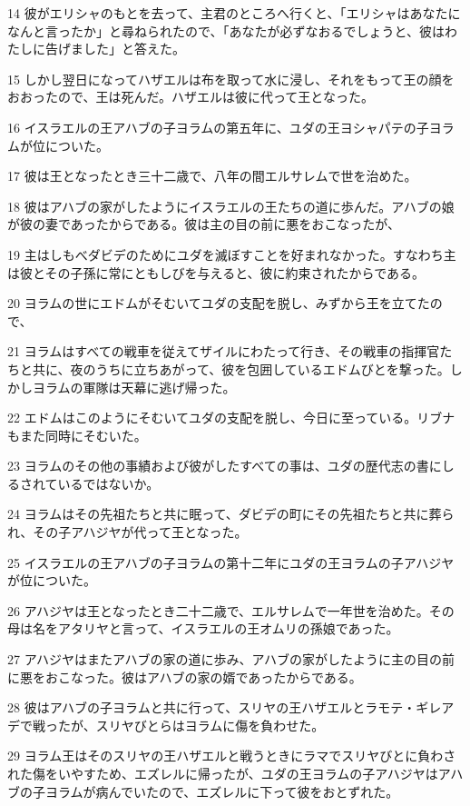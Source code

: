 \par 14 彼がエリシャのもとを去って、主君のところへ行くと、「エリシャはあなたになんと言ったか」と尋ねられたので、「あなたが必ずなおるでしょうと、彼はわたしに告げました」と答えた。
\par 15 しかし翌日になってハザエルは布を取って水に浸し、それをもって王の顔をおおったので、王は死んだ。ハザエルは彼に代って王となった。
\par 16 イスラエルの王アハブの子ヨラムの第五年に、ユダの王ヨシャパテの子ヨラムが位についた。
\par 17 彼は王となったとき三十二歳で、八年の間エルサレムで世を治めた。
\par 18 彼はアハブの家がしたようにイスラエルの王たちの道に歩んだ。アハブの娘が彼の妻であったからである。彼は主の目の前に悪をおこなったが、
\par 19 主はしもべダビデのためにユダを滅ぼすことを好まれなかった。すなわち主は彼とその子孫に常にともしびを与えると、彼に約束されたからである。
\par 20 ヨラムの世にエドムがそむいてユダの支配を脱し、みずから王を立てたので、
\par 21 ヨラムはすべての戦車を従えてザイルにわたって行き、その戦車の指揮官たちと共に、夜のうちに立ちあがって、彼を包囲しているエドムびとを撃った。しかしヨラムの軍隊は天幕に逃げ帰った。
\par 22 エドムはこのようにそむいてユダの支配を脱し、今日に至っている。リブナもまた同時にそむいた。
\par 23 ヨラムのその他の事績および彼がしたすべての事は、ユダの歴代志の書にしるされているではないか。
\par 24 ヨラムはその先祖たちと共に眠って、ダビデの町にその先祖たちと共に葬られ、その子アハジヤが代って王となった。
\par 25 イスラエルの王アハブの子ヨラムの第十二年にユダの王ヨラムの子アハジヤが位についた。
\par 26 アハジヤは王となったとき二十二歳で、エルサレムで一年世を治めた。その母は名をアタリヤと言って、イスラエルの王オムリの孫娘であった。
\par 27 アハジヤはまたアハブの家の道に歩み、アハブの家がしたように主の目の前に悪をおこなった。彼はアハブの家の婿であったからである。
\par 28 彼はアハブの子ヨラムと共に行って、スリヤの王ハザエルとラモテ・ギレアデで戦ったが、スリヤびとらはヨラムに傷を負わせた。
\par 29 ヨラム王はそのスリヤの王ハザエルと戦うときにラマでスリヤびとに負わされた傷をいやすため、エズレルに帰ったが、ユダの王ヨラムの子アハジヤはアハブの子ヨラムが病んでいたので、エズレルに下って彼をおとずれた。

